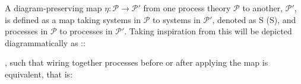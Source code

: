 \documentclass[10pt,twocolumn,aps,groupedaddress,nofootinbib]{revtex4}
\begin{document}
A diagram-preserving map \colorbox{PineGreen!20}{$\eta : \mathcal{P} \to \mathcal{P}'$} from one process theory $\mathcal{P}$ to another, $\mathcal{P}'$, is defined as a map taking
systems in $\mathcal{P}$ to systems in $\mathcal{P}'$, denoted as
\beq
S \to \eta(S),
\eeq
and processes in $\mathcal{P}$ to processes in $\mathcal{P}'$. Taking inspiration from \cite{fritz2018bimonoidal} this will be depicted diagrammatically as
\beq
\eta ::  \mapsto {}
,
\eeq
such that wiring together processes before or after applying the map is equivalent, that is:
\end{document}
